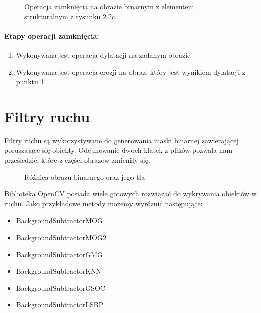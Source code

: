 \documentclass[a4paper,12pt,twoside,openany]{report}
\newcommand{\ImgPath}{.}
\begin{document}
\begin{figure}[H]
	\centering
	\caption{Operacja zamknięcia na obrazie binarnym z elementem strukturalnym z rysunku 2.2c}
\end{figure}

\paragraph{Etapy operacji zamknięcia:}
\begin{enumerate}
	\item Wykonywana jest operacja dylatacji na zadanym obrazie
	\item Wykonywana jest operacja erozji na obraz, który jest wynikiem dylatacji z punktu 1.
\end{enumerate}

\section{Filtry ruchu}
Filtry ruchu są wykorzystywane do generowania maski binarnej zawierającej poruszające się obiekty. Odejmowanie dwóch klatek z plików pozwala nam prześledzić, które z części obrazów zmieniły się. 

\begin{figure}[H]
	\centering
	\caption{Różnica obrazu binarnego oraz jego tła}
\end{figure}

Biblioteka OpenCV posiada wiele gotowych rozwiązać do wykrywania obiektów w ruchu\cite{opencvs2}. Jako przykładowe metody możemy wyróżnić następujące:
\begin{itemize} 
	\item BackgroundSubtractorMOG
	\item BackgroundSubtractorMOG2
	\item BackgroundSubtractorGMG
	\item BackgroundSubtractorKNN
	\item BackgroundSubtractorGSOC
	\item BackgroundSubtractorLSBP
\end{itemize} 
	
\end{document}
